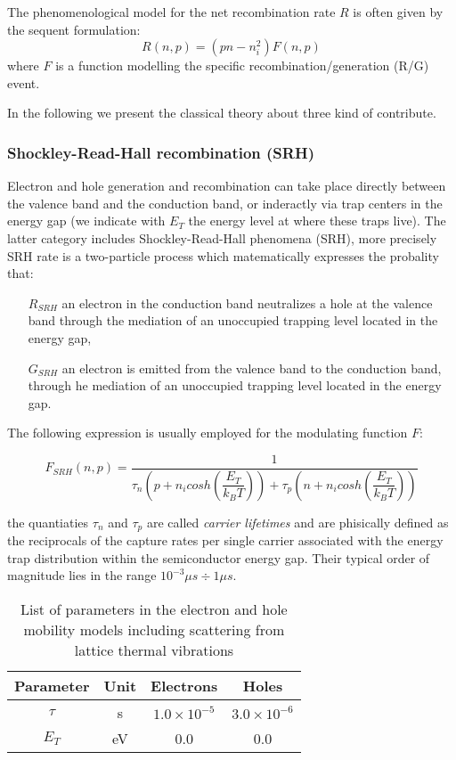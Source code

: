 The phenomenological model for the net recombination rate $R$ is often given by the sequent formulation:
\begin{equation}
\label{eq: generic RG}
R(n,p) = (pn-n_i^2)F(n,p)
\end{equation}
where $F$ is a function modelling the specific recombination/generation (R/G) event.

In the following we present the classical theory about three kind of contribute. 

\subsubsection{Shockley-Read-Hall recombination (SRH)}

Electron and hole generation and recombination can take place directly between the valence band and the conduction band, or inderactly via trap centers in the energy gap (we indicate with $E_T$ the energy level at where these traps live). The latter category includes Shockley-Read-Hall phenomena (SRH), more precisely SRH rate is a two-particle process which matematically expresses the probality that:
\begin{itemize}
\item[$R_{SRH}$] an electron in the conduction band neutralizes a hole at the valence band through the mediation of an unoccupied trapping level located in the energy gap,
\item[$G_{SRH}$] an electron is emitted from the valence band to the conduction band, through he mediation of an unoccupied trapping level located in the energy gap.
\end{itemize}

The following expression is usually employed for the modulating function $F$:

\begin{equation}
F_{SRH}(n,p) = \dfrac{1}{\tau_n\left(p+n_i cosh\left(\dfrac{E_T}{k_BT} \right) \right)+\tau_p\left(n+n_i cosh\left(\dfrac{E_T}{k_BT}\right) \right)}
\end{equation}

the quantiaties $\tau_n$ and $\tau_p$ are called \textit{carrier lifetimes} and are phisically defined as the reciprocals of the capture rates per single carrier associated with the energy trap distribution within the semiconductor energy gap. Their typical order of magnitude lies in the range $10^{-3}\mu s\div 1 \mu s$.

\begin{table}[!h]
\centering
\begin{tabular}{cccc}
\toprule
Parameter & Unit & Electrons & Holes \\
\midrule
$\tau$ & s & $1.0\times 10^{-5}$ & $3.0 \times 10^{-6}$\\
$E_T$ & eV & 0.0 & 0.0\\
\bottomrule
\end{tabular}
\caption{List of parameters in the electron and hole mobility models including scattering from lattice thermal vibrations}
\end{table}

